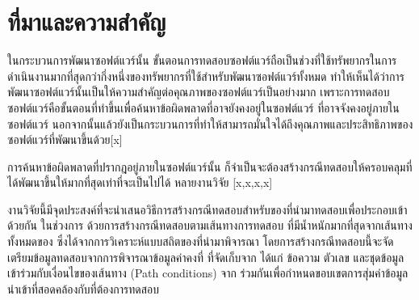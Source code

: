 \section{ที่มาและความสำคัญ} 

ในกระบวนการพัฒนาซอฟต์แวร์นั้น ขั้นตอนการทดสอบซอฟต์แวร์ถือเป็นช่วงที่ใช้ทรัพยากรในการดำเนินงานมากที่สุดกว่ากึ่งหนึ่งของทรัพยากรที่ใช้สำหรับพัฒนาซอฟต์แวร์ทั้งหมด 
ทำให้เห็นได้ว่าการพัฒนาซอฟต์แวร์นั้นเป็นให้ความสำคัญต่อคุณภาพของซอฟต์แวร์เป็นอย่างมาก เพราะการทดสอบซอฟต์แวร์คือขั้นตอนที่ทำขึ้นเพื่อค้นหาข้อผิดพลาดที่อาจยังคงอยู่ในซอฟต์แวร์
ที่อาจจังคงอยู่ภายในซอฟต์แวร์ \cite{Myers:2011:AST:983238} นอกจากนั้นแล้วยังเป็นกระบวนการที่ทำให้สามารถมั่นใจได้ถึงคุณภาพและประสิทธิภาพของซอฟต์แวร์ที่พัฒนาขึ้นด้วย[x]

การค้นหาข้อผิดพลาดที่ปรากฎอยู่ภายในซอฟต์แวร์นั้น ก็จำเป็นจะต้องสร้างกรณีทดสอบให้ครอบคลุม{\sourcecode}ที่ได้พัฒนาขึ้นให้มากที่สุดเท่าที่จะเป็นไปได้ หลายงานวิจัย [x,x,x,x]




งานวิจัยนี้มีจุดประสงค์ที่จะนำเสนอวิธีการสร้างกรณีทดสอบสำหรับ{\sourcecode}ของ{\softwareComponent}ที่นำมาทดสอบเพื่อประกอบเข้าด้วยกัน
ในช่วงการ\FirstTimeDefine{\IntegrationTesting}{\IntegrationTestingEN} ด้วยการสร้างกรณีทดสอบตามเส้นทางการทดสอบ
ที่มีน้ำหนักมากที่สุดจากเส้นทางทั้งหมดของ{\scg} ซึ่งได้จากการวิเคราะห์แบบสถิตของ{\sourcecode}ที่นำมาพิจารณา 
โดยการสร้างกรณีทดสอบนี้จะจัดเตรียมข้อมูลทดสอบจากการพิจารณาข้อมูลค่าคงที่ ที่จัดเก็บจาก{\sourcecode} ได้แก่ ข้อความ ตัวเลข และชุดข้อมูล 
เข้าร่วมกับเงื่อนไขของเส้นทาง (Path conditions) จาก{\cfg} ร่วมกันเพื่อกำหนดขอบเขตการสุ่มค่าข้อมูลนำเข้าที่สอดคล้องกับ{\MethodSignature}ที่ต้องการทดสอบ

